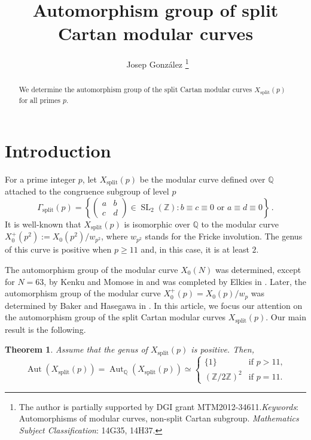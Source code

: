 \documentclass[a4paper,12pt]{article}
\title{Automorphism group of split  Cartan modular  curves}
\author{ \ Josep Gonz\'alez  \footnote{The  author is partially supported by DGI grant  MTM2012-34611.\newline \emph{Keywords}: \,Automorphisms of modular curves, non-split Cartan subgroup.
\newline 2010 \emph{Mathematics Subject Classification}: 14G35, 14H37.}}
\date{}
\newtheorem{teo}{Theorem}%
\theoremstyle{definition}
\theoremstyle{remark}
\numberwithin{equation}{section}
\newcommand{\Q}{\mathbb{Q}}
\newcommand{\Z}{\mathbb{Z}}
\newcommand{\SL}{\operatorname{SL}}
\newcommand{\Aut}{\operatorname{Aut}}
\begin{document}
\maketitle

\begin{abstract}
\noindent
We determine the automorphism group of the split Cartan modular curves $X_{\operatorname{split}}(p)$ for all primes $p$.
\end{abstract}

\section{Introduction}
For a prime integer $p$, let $X_{\operatorname{split}}(p)$ be the modular curve defined over $\Q$ attached to the congruence subgroup of level $p$
$$
\Gamma_{\operatorname{split}}(p)=\left\{ \left (\begin{array}{cc}a &b\\c& d\end{array}\right)\in\SL_2(\Z)\colon b\equiv c\equiv 0 \text{ or }a\equiv d\equiv 0\right\}\,.
$$
It is well-known that  $X_{\operatorname{split}}(p)$ is isomorphic over $\Q$ to the modular curve $X_0^+(p^2):=X_0(p^2)/w_{p^2}$, where $w_{p^2}$ stands for the Fricke involution. The genus of this curve is positive  when $p\geq 11$ and, in this case, it is at least $2$.

The automorphism group of the modular curve $X_0(N)$ was determined, except for $N=63$, by Kenku and Momose in \cite{KM} and was completed by Elkies in \cite{elkies}. Later,  the automorphism group of the modular curve $X_0^+(p)=X_0(p)/w_p$ was determined by Baker and Hasegawa in \cite{BH}. In this article, we focus our attention on  the automorphism group of the  split Cartan modular curves $X_{\operatorname{split}}(p)$.  Our main result is the following.

\begin{teo}\label{teo}
Assume that the genus of $X_{\operatorname{split}}(p)$ is positive. Then,
$$\Aut(X_{\operatorname{split}}(p))=\Aut_{\Q}(X_{\operatorname{split}}(p))\simeq\left\{\begin{array}{cc} \{1\} & \text{if $p>11$,}\\[5 pt]
(\Z/2\Z)^2 & \text{if $p=11$.}\end{array}\right.
$$
\end{teo}
\end{document}
